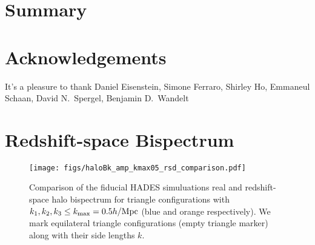 \documentclass[12pt, letterpaper, preprint]{aastex62}
\newcommand{\smnu}{\sum m_\nu}
\newcommand{\sig}{\sigma_8}
\newcommand{\ch}[1]{{\color{orange}{\bf CH:} #1}}
\begin{document}
%
%

\section{Summary} 


\section*{Acknowledgements}
It's a pleasure to thank 
    Daniel Eisenstein, 
    Simone Ferraro, 
    Shirley Ho, 
    Emmaneul Schaan, 
    David N.~Spergel, 
    Benjamin D.~Wandelt


\appendix
\section{Redshift-space Bispectrum} 
\begin{figure}
\begin{center}
    \texttt{[image: figs/haloBk\_amp\_kmax05\_rsd\_comparison.pdf]}
    \caption{Comparison of the fiducial HADES simuluations real and redshift-space halo
    bispectrum for triangle configurations with $k_1, k_2, k_3 \leq k_{\rm max} = 0.5 h/{\rm Mpc}$ 
    (blue and orange respectively). We mark equilateral triangle configurations (empty 
    triangle marker) along with their side lengths $k$.
    }
\label{fig:cov_converge}
\end{center}
\end{figure}
\end{document}
